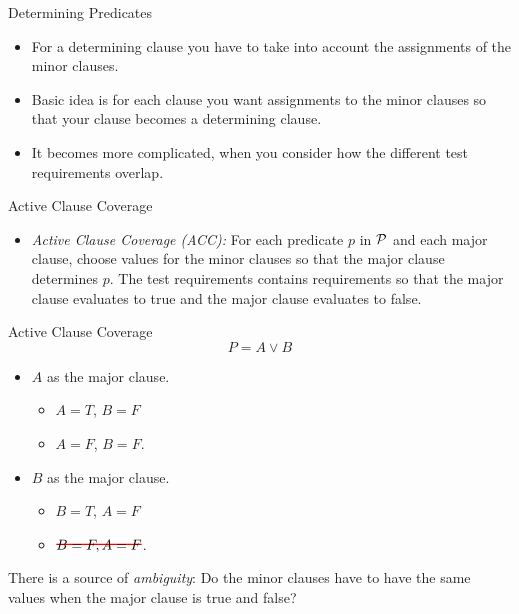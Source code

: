 \documentclass{beamer}
\newcommand{\predset}{{\cal P}}
\newcommand\hcancel[2][red]{\setbox0=\hbox{$#2$}%
\rlap{\raisebox{.45\ht0}{\textcolor{#1}{\rule{\wd0}{1pt}}}}#2}
\begin{document}
\begin{frame}{Determining Predicates}
    
  \begin{itemize}
  \item For a determining clause you have to take into account the
    assignments of the minor clauses.

  \item Basic idea is for each clause you want assignments to the minor
clauses so that your clause becomes a determining clause.
\item It becomes more complicated, when you consider how the different
  test requirements overlap.
  \end{itemize} 
\end{frame}
\begin{frame}{Active Clause Coverage}
  \begin{itemize}
  \item {\em Active Clause Coverage (ACC):} For each predicate $p$ in
    $\predset$ and each major clause, choose values for the  minor
    clauses so that the major clause determines $p$. The test
    requirements contains  requirements so  that the major clause
    evaluates to true and the major clause evaluates to false.
  \end{itemize}

  
\end{frame}
\begin{frame}{Active Clause Coverage}
\[
 P = A \lor B 
\]
  \begin{itemize}
  \item $A$ as the major clause.
    \begin{itemize}
    \item $A=T$, $B=F$
    \item $A=F$, $B=F$.
    \end{itemize}
  \item $B$ as the major clause.
    \begin{itemize}
    \item $B=T$, $A=F$
    \item $\hcancel{B=F, A=F}$.
    \end{itemize}
  \end{itemize}
 There is a source of {\em ambiguity}: Do the minor clauses have to
 have the same values when the major clause is true and false?
\end{frame}
\end{document}
